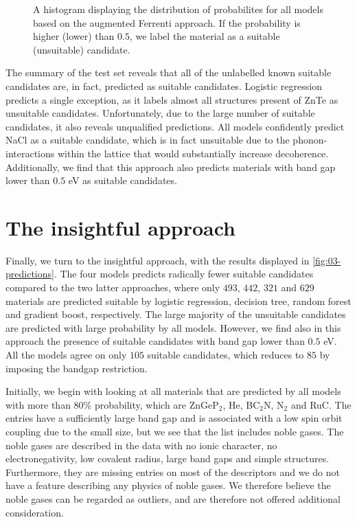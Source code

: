 \begin{figure}[ht!]
    \centering
    
    \vspace*{-130mm}
    \caption{A histogram displaying the distribution of probabilites for all models based on the augmented Ferrenti approach. If the probability is higher (lower) than $0.5$, we label the material as a suitable (unsuitable) candidate.}
    \label{fig:histogram-augmented-ferrenti}
\end{figure}

The summary of the test set reveals that all of the unlabelled known suitable candidates are, in fact, predicted as suitable candidates. Logistic regression predicts a single exception, as it labels almost all structures present of ZnTe as unsuitable candidates. Unfortunately, due to the large number of suitable candidates, it also reveals unqualified predictions. All models confidently predict NaCl as a suitable candidate, which is in fact unsuitable due to the phonon-interactions within the lattice that would substantially increase decoherence. Additionally, we find that this approach also predicts materials with band gap lower than $0.5$ eV as suitable candidates.


\section{The insightful approach}

Finally, we turn to the insightful approach, with the results displayed in \autoref{fig:03-predictions}. The four models predicts radically fewer suitable candidates compared to the two latter approaches, where only $493$, $442$, $321$ and $629$ materials are predicted suitable by logistic regression, decision tree, random forest and gradient boost, respectively. The large majority of the unsuitable candidates are predicted with large probability by all models. However, we find also in this approach the presence of suitable candidates with band gap lower than $0.5$ eV. All the models agree on only $105$ suitable candidates, which reduces to $85$ by imposing the bandgap restriction.



\noindent Initially, we begin with looking at all materials that are predicted by all models with more than $80\%$ probability, which are ZnGeP$_2$, He, BC$_2$N, N$_2$ and RuC. The entries have a sufficiently large band gap and is associated with a low spin orbit coupling due to the small size, but we see that the list includes noble gases. The noble gases are described in the data with no ionic character, no electronegativity, low covalent radius, large band gaps and simple structures. Furthermore, they are missing entries on most of the descriptors and we do not have a feature describing any physics of noble gases. We therefore believe the noble gases can be regarded as outliers, and are therefore not offered additional consideration.


